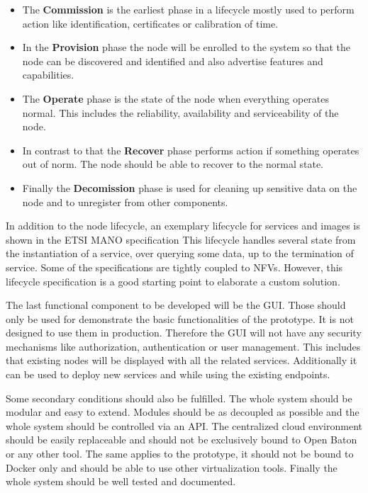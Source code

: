 \begin{itemize}
  \item The \textbf{Commission} is the earliest phase in a lifecycle mostly used to perform action like identification, certificates or calibration of time.\autocite[p. 52 f.]{OpenFog:2017}
  \item In the \textbf{Provision} phase the node will be enrolled to the system so that the node can be discovered and identified and also advertise features and capabilities.\autocite[p. 52 f.]{OpenFog:2017}
  \item The \textbf{Operate} phase is the state of the node when everything operates normal. This includes the reliability, availability and serviceability of the node.\autocite[p. 53]{OpenFog:2017}
  \item In contrast to that the \textbf{Recover} phase performs action if something operates out of norm.\autocite[p. 53]{OpenFog:2017} The node should be able to recover to the normal state.\autocite[p. 53]{OpenFog:2017}
  \item Finally the \textbf{Decomission} phase is used for cleaning up sensitive data on the node and to unregister from other components.\autocite[p. 53]{OpenFog:2017}
\end{itemize}

In addition to the node lifecycle, an exemplary lifecycle for services and images is shown in the \ac{ETSI} \ac{MANO} specification\autocite[p. 67 ff.]{ETSI:MANO:2014}
This lifecycle handles several state from the instantiation of a service, over querying some data, up to the termination of service.
Some of the specifications are tightly coupled to \acp{NFV}.
However, this lifecycle specification is a good starting point to elaborate a custom solution.

The last functional component to be developed will be the \ac{GUI}.
Those should only be used for demonstrate the basic functionalities of the prototype.
It is not designed to use them in production.
Therefore the \ac{GUI} will not have any security mechanisms like authorization, authentication or user management.
This includes that existing nodes will be displayed with all the related services.
Additionally it can be used to deploy new services and while using the existing endpoints.

Some secondary conditions should also be fulfilled.
The whole system should be modular and easy to extend.
Modules should be as decoupled as possible and the whole system should be controlled via an \ac{API}.
The centralized cloud environment should be easily replaceable and should not be exclusively bound to Open Baton or any other tool.
The same applies to the prototype, it should not be bound to Docker only and should be able to use other virtualization tools.
Finally the whole system should be well tested and documented.


